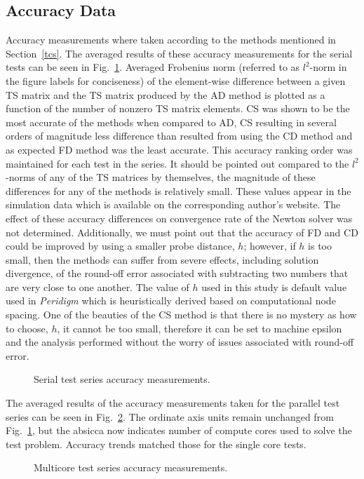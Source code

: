 \documentclass[preprint,12pt]{elsarticle}
\begin{document}
\subsection{Accuracy Data}
Accuracy measurements where taken according to the methods mentioned in Section~\ref{tcs}. The averaged results of these accuracy measurements for the serial tests can be seen in Fig.~\ref{fig:serial_accuracy}. Averaged Frobenius norm (referred to as $l^2$-norm in the figure labels for conciseness) of the element-wise difference between a given TS matrix and the TS matrix produced by the AD method is plotted as a function of the number of nonzero TS matrix elements. CS was shown to be the most accurate of the methods when compared to AD, CS resulting in several orders of magnitude less difference than resulted from using the CD method and as expected FD method was the least accurate. This accuracy ranking order was maintained for each test in the series. It should be pointed out compared to the $l^2$-norms of any of the TS matrices by themselves, the magnitude of these differences for any of the methods is relatively small. These values appear in the simulation data which is available on the corresponding author's website. The effect of these accuracy differences on convergence rate of the Newton solver was not determined.  Additionally, we must point out that the accuracy of FD and CD could be improved by using a smaller probe distance, $h$; however, if $h$ is too small, then the methods can suffer from severe effects, including solution divergence, of the round-off error associated with subtracting two numbers that are very close to one another.  The value of $h$ used in this study is default value used in \emph{Peridigm} which is heuristically derived based on computational node spacing.  One of the beauties of the CS method is that there is no mystery as how to choose, $h$, it cannot be too small, therefore it can be set to machine epsilon and the analysis performed without the worry of issues associated with round-off error.
%
\begin{figure}[tbp]
  \centering
  \scalebox{1.0}{}
  \caption{Serial test series accuracy measurements.}
  \label{fig:serial_accuracy}
\end{figure}
%
The averaged results of the accuracy measurements taken for the parallel test series can be seen in Fig.~\ref{fig:multi_accuracy}. The ordinate axis units remain unchanged from Fig.~\ref{fig:serial_accuracy}, but the absicca now indicates number of compute cores used to solve the test problem. Accuracy trends matched those for the single core tests. 
%
\begin{figure}[tbp]
  \centering
  \scalebox{1.0}{}
  \caption{Multicore test series accuracy measurements.}
  \label{fig:multi_accuracy}
\end{figure}
\end{document}

